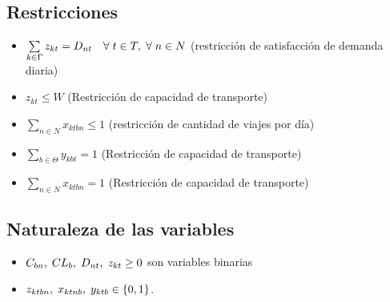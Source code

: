 \documentclass{article}
\begin{document}
\begin{flushleft}
		\subsection{Restricciones}
		\begin{itemize}
			\item $\sum\limits_{k \in \Gamma} z_{kt} = D_{nt} \hspace{1em} \forall \hspace{1mm} t \hspace{0mm} \in T, \hspace{1mm} \forall \hspace{1mm} n \in N $  (restricci\'on de satisfacci\'on de demanda diaria)
			\item $z_{kt} \leq W$ (Restricción de capacidad de transporte)
			\item $\sum\limits_{n \in N} x_{ktbn} \leq 1$ (restricción de cantidad de viajes por día)
			\item $\sum\limits_{b \in \Theta} y_{kbt} = 1$ (Restricción de capacidad de transporte)
			\item $\sum\limits_{n \in N} x_{ktbn} = 1$ (Restricción de capacidad de transporte)
		\end{itemize}

		\subsection{Naturaleza de las variables}
		\begin{itemize}
			\item $C_{bn},\hspace{1mm} CL_{b},\hspace{1mm} D_{nt},\hspace{1mm} z_{kt} \geq 0$ son variables binarias
			\item $z_{ktbn},\hspace{1mm} x_{ktnb},\hspace{1mm} y_{ktb} \in \{0,1\}$.
		\end{itemize}
		

\end{flushleft}
\end{document}
